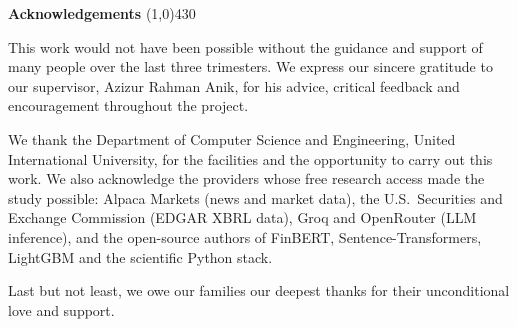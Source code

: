 \begin{center}
{\huge \bf Acknowledgements}
\line(1,0){430}
\end{center}

This work would not have been possible without the guidance and support of many people over the last three trimesters. We express our sincere gratitude to our supervisor, Azizur Rahman Anik, for his advice, critical feedback and encouragement throughout the project.

We thank the Department of Computer Science and Engineering, United International University, for the facilities and the opportunity to carry out this work. We also acknowledge the providers whose free research access made the study possible: Alpaca Markets (news and market data), the U.S.\ Securities and Exchange Commission (EDGAR XBRL data), Groq and OpenRouter (LLM inference), and the open-source authors of FinBERT, Sentence-Transformers, LightGBM and the scientific Python stack.

Last but not least, we owe our families our deepest thanks for their unconditional love and support.
